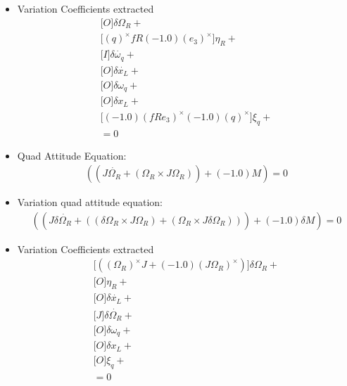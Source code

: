 \begin{itemize}
\item Variation Coefficients extracted
\begin{gather}
\Big[O\Big]\delta \Omega_{R}+\nonumber\\
\Big[{(q)}^\times f R (-1.0) {(e_3)}^\times\Big]\eta_{R}+\nonumber\\
\Big[I\Big]\delta \dot{\omega_{q}}+\nonumber\\
\Big[O\Big]\delta \dot{x_L}+\nonumber\\
\Big[O\Big]\delta \omega_{q}+\nonumber\\
\Big[O\Big]\delta x_L+\nonumber\\
\Big[(-1.0) {(fR e_3)}^\times (-1.0) {(q)}^\times\Big]\xi_{q}+\nonumber\\
=0
\end{gather}
\item Quad Attitude Equation: \begin{gather}
((J \dot{\Omega_{R}}+(\Omega_{R}\times J \Omega_{R}))+(-1.0)M)=0
\end{gather}
\item Variation quad attitude equation: \begin{gather}
((J \delta \dot{\Omega_{R}}+((\delta \Omega_{R}\times J \Omega_{R})+(\Omega_{R}\times J \delta \Omega_{R})))+(-1.0)\delta M)=0
\end{gather}
\item Variation Coefficients extracted
\begin{gather}
\Big[({(\Omega_{R})}^\times J+(-1.0) {(J \Omega_{R})}^\times)\Big]\delta \Omega_{R}+\nonumber\\
\Big[O\Big]\eta_{R}+\nonumber\\
\Big[O\Big]\delta \dot{x_L}+\nonumber\\
\Big[J\Big]\delta \dot{\Omega_{R}}+\nonumber\\
\Big[O\Big]\delta \omega_{q}+\nonumber\\
\Big[O\Big]\delta x_L+\nonumber\\
\Big[O\Big]\xi_{q}+\nonumber\\
=0
\end{gather}
\end{itemize}
